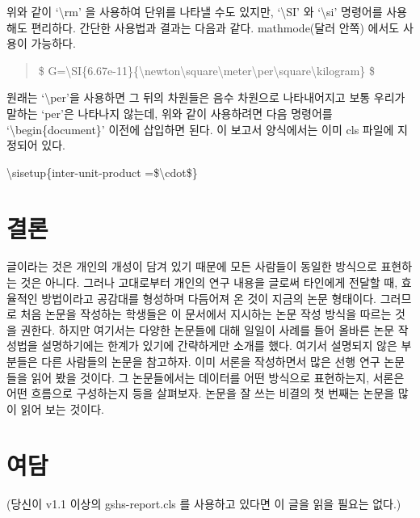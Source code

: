 \documentclass{gshs-report-v1.2}
\begin{document}
위와 같이 `\textbackslash rm' 을 사용하여 단위를 나타낼 수도 있지만,
`\textbackslash SI' 와 `\textbackslash si' 명령어를 사용해도 편리하다. 
간단한 사용법과 결과는 다음과 같다. mathmode(달러 안쪽) 에서도 사용이 가능하다.

\begin{center}
	\begin{quote}
		\$ G=\textbackslash SI\{6.67e-11\}\{\textbackslash newton\textbackslash square\textbackslash meter\textbackslash per\textbackslash square\textbackslash kilogram\} \$
	\end{quote}
	
	\begin{quote}
	\end{quote}
\end{center}

원래는 `\textbackslash per'을 사용하면 그 뒤의 차원들은 음수 차원으로 나타내어지고 보통 우리가 말하는 `per'은 나타나지 않는데,
위와 같이 사용하려면 다음 명령어를 `\textbackslash begin\{document\}' 이전에 삽입하면 된다.
이 보고서 양식에서는 이미 cls 파일에 지정되어 있다. 
\begin{center}
	\textbackslash sisetup\{inter-unit-product =\$\textbackslash cdot\$\}
\end{center}



\section{결론}
글이라는 것은 개인의 개성이 담겨 있기 때문에 모든 사람들이 동일한 방식으로 표현하는 것은 아니다. 그러나 고대로부터 개인의 연구 내용을 글로써 타인에게 전달할 때, 효율적인 방법이라고 공감대를 형성하며 다듬어져 온 것이 지금의 논문 형태이다. 그러므로 처음 논문을 작성하는 학생들은 이 문서에서 지시하는 논문 작성 방식을 따르는 것을 권한다. 하지만 여기서는 다양한 논문들에 대해 일일이 사례를 들어 올바른 논문 작성법을 설명하기에는 한계가 있기에 간략하게만 소개를 했다. 여기서 설명되지 않은 부분들은 다른 사람들의 논문을 참고하자. 이미 서론을 작성하면서 많은 선행 연구 논문들을 읽어 봤을 것이다. 그 논문들에서는 데이터를 어떤 방식으로 표현하는지, 서론은 어떤 흐름으로 구성하는지 등을 살펴보자. 논문을 잘 쓰는 비결의 첫 번째는 논문을 많이 읽어 보는 것이다.




\section{여담}
(당신이 v1.1 이상의 gshs-report.cls 를 사용하고 있다면 이 글을 읽을 필요는 없다.)
\end{document}
